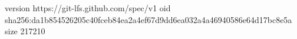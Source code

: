 version https://git-lfs.github.com/spec/v1
oid sha256:da1b854526205c40fceb84ea2a4ef67d9dd6ea032a4a46940586e64d17bc8e5a
size 217210
